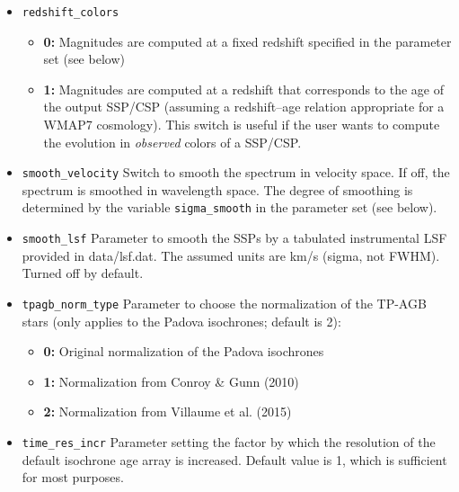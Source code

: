 \documentclass[]{article}
\begin{document}
\begin{itemize}
\item \texttt{redshift\_colors}
  \begin{itemize}
  \item {\bf 0:}  Magnitudes are computed at a fixed redshift specified in the
    parameter set (see below)
  \item {\bf 1:}  Magnitudes are computed at a redshift that corresponds to the
    age of the output SSP/CSP (assuming a redshift--age relation appropriate for
    a WMAP7 cosmology).  This switch is useful if the user wants to compute the
    evolution in {\it observed} colors of a SSP/CSP.
  \end{itemize}
\end{itemize}

\begin{itemize}
\item \texttt{smooth\_velocity}
Switch to smooth the spectrum in velocity space.  If off, the spectrum is
smoothed in wavelength space.  The degree of smoothing is determined by the
variable \texttt{sigma\_smooth} in the parameter set (see below).
\end{itemize}

\begin{itemize}
\item \texttt{smooth\_lsf}
Parameter to smooth the SSPs by a tabulated instrumental LSF provided in
data/lsf.dat.  The assumed units are km/s (sigma, not FWHM). Turned off by
default.
\end{itemize}

\begin{itemize}
\item \texttt{tpagb\_norm\_type}
Parameter to choose the normalization of the TP-AGB stars (only applies to the
Padova isochrones; default is 2):

  \begin{itemize}
  \item {\bf 0:}  Original normalization of the Padova isochrones
  \item {\bf 1:}  Normalization from Conroy \& Gunn (2010)
  \item {\bf 2:}  Normalization from Villaume et al. (2015)
  \end{itemize}
\end{itemize}

\begin{itemize}
\item \texttt{time\_res\_incr}
Parameter setting the factor by which the resolution of the default isochrone
age array is increased.  Default value is 1, which is sufficient for most
purposes.
\end{itemize}
\end{document}

